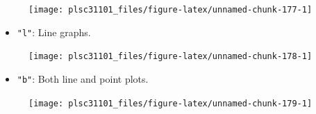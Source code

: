 \documentclass[
]{book}
\newenvironment{Shaded}{\begin{snugshade}}{\end{snugshade}}
\newcommand{\CommentTok}[1]{\textcolor[rgb]{0.56,0.35,0.01}{\textit{#1}}}
\newcommand{\DataTypeTok}[1]{\textcolor[rgb]{0.13,0.29,0.53}{#1}}
\newcommand{\KeywordTok}[1]{\textcolor[rgb]{0.13,0.29,0.53}{\textbf{#1}}}
\newcommand{\NormalTok}[1]{#1}
\newcommand{\OperatorTok}[1]{\textcolor[rgb]{0.81,0.36,0.00}{\textbf{#1}}}
\newcommand{\StringTok}[1]{\textcolor[rgb]{0.31,0.60,0.02}{#1}}
\providecommand{\tightlist}{%
  \setlength{\itemsep}{0pt}\setlength{\parskip}{0pt}}
\begin{document}
\begin{figure}

{\centering \texttt{[image: plsc31101\_files/figure-latex/unnamed-chunk-177-1]} 

}

\caption{ }\label{fig:unnamed-chunk-177}
\end{figure}

\begin{itemize}
\tightlist
\item
  \texttt{"l"}: Line graphs.
\end{itemize}

\begin{Shaded}
\end{Shaded}

\begin{figure}

{\centering \texttt{[image: plsc31101\_files/figure-latex/unnamed-chunk-178-1]} 

}

\caption{ }\label{fig:unnamed-chunk-178}
\end{figure}

\begin{itemize}
\tightlist
\item
  \texttt{"b"}: Both line and point plots.
\end{itemize}

\begin{Shaded}
\end{Shaded}

\begin{figure}

{\centering \texttt{[image: plsc31101\_files/figure-latex/unnamed-chunk-179-1]} 

}

\caption{ }\label{fig:unnamed-chunk-179}
\end{figure}
\end{document}
